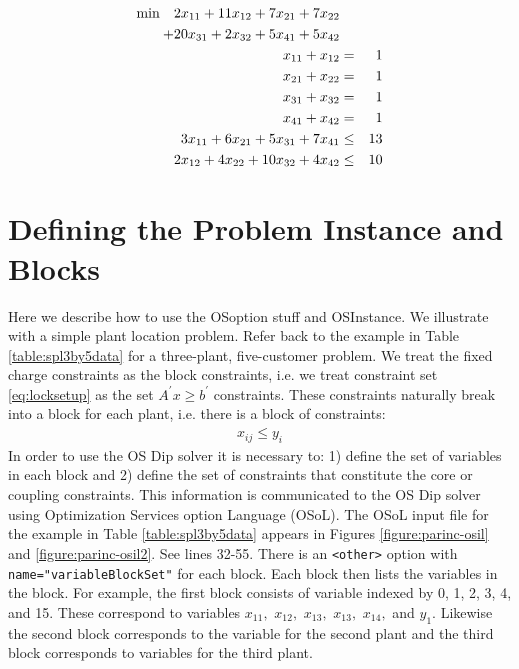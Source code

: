 \documentclass[11pt]{article}
\newcounter{Fig}
\begin{document}
 
\begin{eqnarray*}
{\rm min} \quad 2 x_{11} + 11 x_{12} + 7 x_{21} + 7 x_{22} && \\
+ 20 x_{31} + 2 x_{32} + 5 x_{41} + 5x_{42} && \\
x_{11} + x_{12}  &=&    1  \\
x_{21} + x_{22}  &=&    1 \\
x_{31} + x_{32} &=&    1 \\
x_{41} + x_{42} &=&    1 \\
3 x_{11} + 6 x_{21} + 5 x_{31} + 7 x_{41} &\le&   13 \\
2 x_{12} + 4 x_{22} + 10 x_{32} + 4 x_{42} &\le&   10
\end{eqnarray*}
 

\section{Defining the Problem Instance and Blocks}\label{section:defineinstance}

Here we describe how to use the OSoption stuff and OSInstance.  We illustrate
with a simple plant location problem. Refer back to the example in Table
\ref{table:spl3by5data} for a three-plant, five-customer problem. We treat the
fixed charge constraints as the block constraints, i.e. we treat constraint set
\ref{eq:locksetup} as the set $A^{\prime} x \ge b^{\prime}$ constraints. These
constraints naturally break into a block for each plant, i.e. there is a block
of constraints:
\begin{eqnarray}
x_{ij} \le y_{i}
\end{eqnarray}
In order to use the OS Dip solver it is necessary to: 1) define the set of
variables in each block and 2) define the set of constraints that constitute the
core or coupling constraints. This information is communicated to the OS Dip
solver using Optimization Services option Language (OSoL). The OSoL input file
for the example in  Table \ref{table:spl3by5data} appears in Figures
\ref{figure:parinc-osil} and \ref{figure:parinc-osil2}.  See lines 32-55. There
is an {\tt <other>} option with {\tt name="variableBlockSet"} for each block.
Each block then lists the variables in the block. For example, the first block
consists of variable indexed by 0, 1, 2, 3, 4, and 15. These correspond to
variables $x_{11},$  $x_{12},$  $x_{13},$  $x_{13},$ $x_{14},$ and  $y_{1}.$
Likewise the second block corresponds to the variable for the second plant and
the third block corresponds to variables for the third plant.
\end{document}
